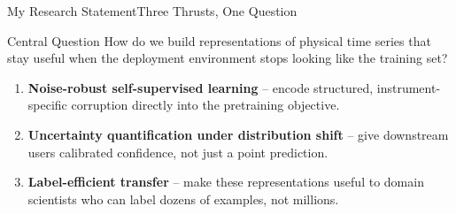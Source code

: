 \begin{frame}{My Research Statement}{Three Thrusts, One Question}
  \begin{contributionbox}{Central Question}
    How do we build representations of physical time series that stay useful
    when the deployment environment stops looking like the training set?
  \end{contributionbox}

  \vspace{0.25cm}
  \begin{enumerate}
    \item \textbf{Noise-robust self-supervised learning} -- encode structured,
      instrument-specific corruption directly into the pretraining objective.
    \item \textbf{Uncertainty quantification under distribution shift} -- give
      downstream users calibrated confidence, not just a point prediction.
    \item \textbf{Label-efficient transfer} -- make these representations useful
      to domain scientists who can label dozens of examples, not millions.
  \end{enumerate}
\end{frame}
